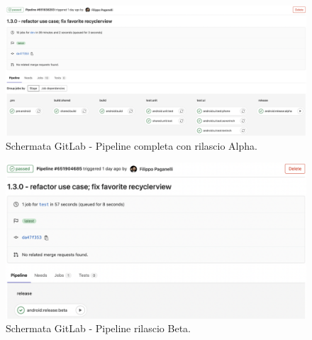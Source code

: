 \begin{figure}[H]
\centering
    \includegraphics[width=1\textwidth]{img/Screenshot 2022-09-28 at 15.51.47.png}
    \caption{Schermata GitLab - Pipeline completa con rilascio Alpha.}
    \label{alpharelease}
\end{figure}

\begin{figure}[H]
\centering
    \includegraphics[width=1\textwidth]{img/Screenshot 2022-09-28 at 16.11.22.png}
    \caption{Schermata GitLab - Pipeline rilascio Beta.}
    \label{betarelease}
\end{figure}

